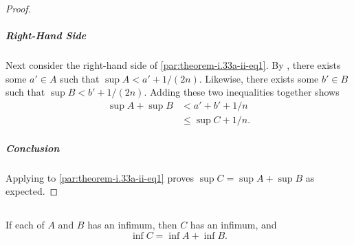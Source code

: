 \documentclass{article}
\begin{document}
\begin{proof}
    \subparagraph{Right-Hand Side}%

      Next consider the right-hand side of \eqref{par:theorem-i.33a-ii-eq1}.
      By , there exists some $a' \in A$ such that
        $\sup{A} < a' + 1 / (2n)$.
      Likewise, there exists some $b' \in B$ such that
        $\sup{B} < b' + 1 / (2n)$.
      Adding these two inequalities together shows
        \begin{align*}
          \sup{A} + \sup{B}
            & < a' + b' + 1 / n \\
            & \leq \sup{C} + 1 / n.
        \end{align*}

    \subparagraph{Conclusion}%

      Applying  to \eqref{par:theorem-i.33a-ii-eq1}
        proves $\sup{C} = \sup{A} + \sup{B}$ as expected.

\end{proof}

\subsection*{}%
%

If each of $A$ and $B$ has an infimum, then $C$ has an infimum, and
  $$\inf{C} = \inf{A} + \inf{B}.$$
\end{document}
